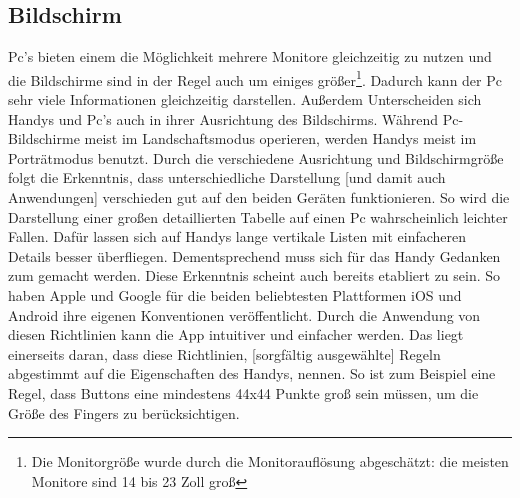 \subsection{Bildschirm}\myCheckmark
Pc's bieten einem die Möglichkeit mehrere Monitore gleichzeitig zu nutzen und die Bildschirme sind in der Regel auch um einiges größer\cite{pcVsphone_screenResolutionStats}\cite{pcVsphone_screenResolutionToSize}\footnote{Die Monitorgröße wurde durch die Monitorauflösung abgeschätzt: die meisten Monitore sind 14 bis 23 Zoll groß}.\newline%
	Dadurch kann der Pc sehr viele Informationen gleichzeitig darstellen.\newline%
Außerdem Unterscheiden sich Handys und Pc's auch in ihrer Ausrichtung des Bildschirms. Während Pc-Bildschirme meist im Landschaftsmodus operieren, werden Handys meist im Porträtmodus benutzt.\newline%
	Durch die verschiedene Ausrichtung und Bildschirmgröße folgt die Erkenntnis, dass unterschiedliche Darstellung [und damit auch Anwendungen] verschieden gut auf den beiden Geräten funktionieren. %
		So wird die Darstellung einer großen detaillierten Tabelle auf einen Pc wahrscheinlich leichter Fallen. Dafür lassen sich auf Handys lange vertikale Listen mit einfacheren Details besser überfliegen.\newline%
Dementsprechend muss sich für das Handy Gedanken zum  gemacht werden. %
	Diese Erkenntnis scheint auch bereits etabliert zu sein. So haben Apple und Google für die beiden beliebtesten Plattformen iOS und Android\cite{pcVsphone_mobileOperatingSystem} ihre eigenen Konventionen veröffentlicht\cite{konventionen_guidelinesApple, konventionen_guidelinesGoogle}. %
	Durch die Anwendung von diesen Richtlinien kann die App intuitiver und einfacher werden. %
		Das liegt einerseits daran, dass diese Richtlinien, [sorgfältig ausgewählte] Regeln abgestimmt auf die Eigenschaften des Handys, nennen. So ist zum Beispiel eine Regel, dass Buttons eine mindestens 44x44 Punkte groß sein müssen, um die Größe des Fingers zu berücksichtigen\cite{konventionen_buttonSize}.\newline%
